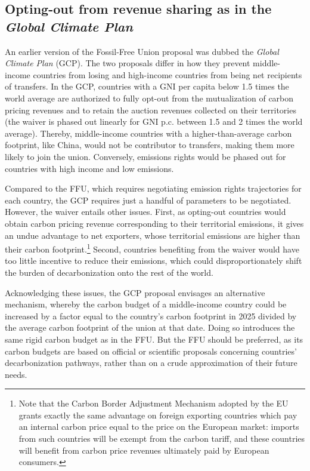 \documentclass[12pt,english]{article}
\begin{document}

\subsection{Opting-out from revenue sharing as in the \textit{Global Climate Plan}}\label{subsec:gcp}

An earlier version of the Fossil-Free Union proposal was dubbed the \textit{Global Climate Plan} (GCP).\cite{fabre_global_2023,fabre_global_2024} The two proposals differ in how they prevent middle-income countries from losing %
and high-income countries from being net recipients of transfers. In the GCP, countries with a GNI per capita below 1.5 times the world average are authorized to fully opt-out from the mutualization of carbon pricing revenues and to retain the auction revenues collected on their territories (the waiver is phased out linearly for GNI p.c. between 1.5 and 2 times the world average). Thereby, middle-income countries with a higher-than-average carbon footprint, like China, would not be contributor to transfers, making them more likely to join the union. Conversely, emissions rights would be phased out for countries with high income and low emissions. 

Compared to the FFU, which requires negotiating emission rights trajectories for each country, the GCP requires just a handful of parameters to be negotiated. However, the waiver entails other issues. First, as opting-out countries would obtain carbon pricing revenue corresponding to their territorial emissions, it gives an undue advantage to net exporters, whose territorial emissions are higher than their carbon footprint.\footnote{Note that the Carbon Border Adjustment Mechanism adopted by the EU grants exactly the same advantage on foreign exporting
countries which pay an internal carbon price equal to the price on the European market: imports from such countries will be exempt from the carbon tariff, and these countries will benefit from carbon price revenues ultimately paid by European consumers.} Second, countries benefiting from the waiver would have too little incentive to reduce their emissions, which could disproportionately shift the burden of decarbonization onto the rest of the world. 

Acknowledging these issues, the GCP proposal envisages an alternative mechanism,\cite{fabre_global_2024} whereby the carbon budget of a middle-income country could be increased by a factor equal to the country's carbon footprint in 2025 divided by the average carbon footprint of the union at that date. Doing so introduces the same rigid carbon budget as in the FFU. But the FFU should be preferred, as its carbon budgets are based on official or scientific proposals concerning countries' decarbonization pathways, rather than on a crude approximation of their future needs.
\end{document}
